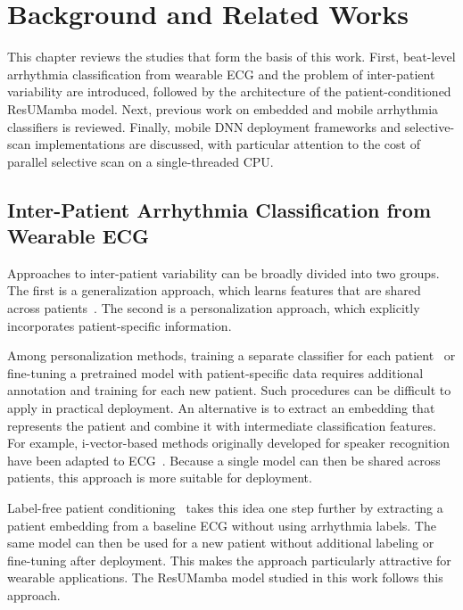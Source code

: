 \chapter{Background and Related Works} \label{ch:background}

This chapter reviews the studies that form the basis of this work.
First, beat-level arrhythmia classification from wearable ECG and the problem of inter-patient variability are introduced, followed by the architecture of the patient-conditioned ResUMamba model.
Next, previous work on embedded and mobile arrhythmia classifiers is reviewed.
Finally, mobile DNN deployment frameworks and selective-scan implementations are discussed, with particular attention to the cost of parallel selective scan on a single-threaded CPU.

\section{Inter-Patient Arrhythmia Classification from Wearable ECG} \label{sec:bg_wearable}

Approaches to inter-patient variability can be broadly divided into two groups.
The first is a generalization approach, which learns features that are shared across patients~\cite{de2004automatic,niu2019inter,jeong2024enhancing}.
The second is a personalization approach, which explicitly incorporates patient-specific information.

Among personalization methods, training a separate classifier for each patient~\cite{llamedo2012automatic,de2006patient,fan2025class} or fine-tuning a pretrained model with patient-specific data requires additional annotation and training for each new patient.
Such procedures can be difficult to apply in practical deployment.
An alternative is to extract an embedding that represents the patient and combine it with intermediate classification features.
For example, i-vector-based methods originally developed for speaker recognition have been adapted to ECG~\cite{xu2019ivector}.
Because a single model can then be shared across patients, this approach is more suitable for deployment.

Label-free patient conditioning~\cite{heo2026resumamba} takes this idea one step further by extracting a patient embedding from a baseline ECG without using arrhythmia labels.
The same model can then be used for a new patient without additional labeling or fine-tuning after deployment.
This makes the approach particularly attractive for wearable applications.
The ResUMamba model studied in this work follows this approach.

